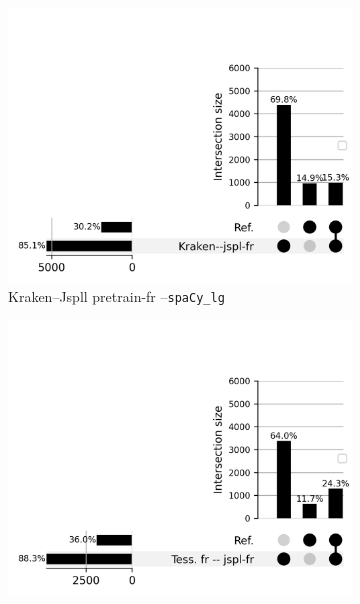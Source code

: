 \begin{figure}[h!]
    \begin{minipage}{6.5cm}
  \begin{subfigure}{0.8\textwidth}
  \includegraphics[width=1\textwidth]{REVUETAL_article_23102023/IMAGES/ELTeC_INTERSECTIONS_spaCy3.5.1_12072024/DATA_ELTeC-fra_spaCy3.5.1_Kraken--jspl-fr_upsetplot.png} 
  \caption{Kraken--Jspll pretrain-fr --\texttt{spaCy\_lg}}
  \label{fig:ELTeCFRA_Kraken -- jspl-fr_spacy-lg-concat_intersection.png}
  \end{subfigure}
  \end{minipage}
  \begin{minipage}{6.5cm}
  \begin{subfigure}{0.8\textwidth}
  \includegraphics[width=1\textwidth]{REVUETAL_article_23102023/IMAGES/ELTeC_INTERSECTIONS_spaCy3.5.1_12072024/DATA_ELTeC-fra_spaCy3.5.1_Tess. fr -- jspl-fr_upsetplot.png} 

\end{subfigure}
\end{minipage}
\end{figure}
